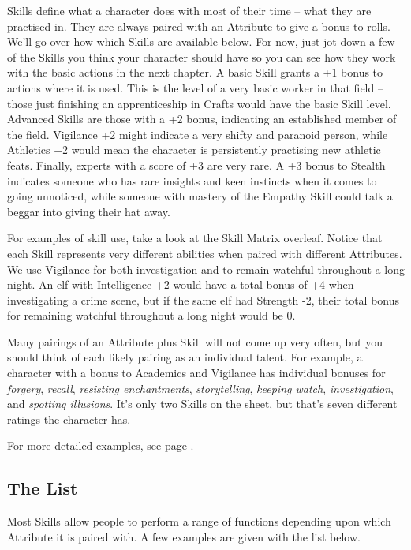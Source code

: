 \begin{multicols}{2}
\noindent
Skills define what a character does with most of their time -- what they are practised in.
They are always paired with an Attribute to give a bonus to rolls.
We'll go over how which Skills are available below.
For now, just jot down a few of the Skills you think your character should have so you can see how they work with the basic actions in the next chapter.
A basic Skill grants a +1 bonus to actions where it is used.
This is the level of a very basic worker in that field -- those just finishing an apprenticeship in Crafts would have the basic Skill level.
Advanced Skills are those with a +2 bonus, indicating an established member of the field.
Vigilance +2 might indicate a very shifty and paranoid person, while Athletics +2 would mean the character is persistently practising new athletic feats.
Finally, experts with a score of +3 are very rare.
A +3 bonus to Stealth indicates someone who has rare insights and keen instincts when it comes to going unnoticed, while someone with mastery of the Empathy Skill could talk a beggar into giving their hat away.

For examples of skill use, take a look at the Skill Matrix overleaf.  Notice that each Skill represents very different abilities when paired with different Attributes.
We use Vigilance for both investigation and to remain watchful throughout a long night.
An elf with Intelligence +2 would have a total bonus of +4 when investigating a crime scene, but if the same elf had Strength -2, their total bonus for remaining watchful throughout a long night would be 0.

Many pairings of an Attribute plus Skill will not come up very often, but you should think of each likely pairing as an individual talent.
For example, a character with a bonus to Academics and Vigilance has individual bonuses for \textit{forgery}, \textit{recall}, \textit{resisting enchantments}, \textit{storytelling}, \textit{keeping watch}, \textit{investigation}, and \textit{spotting illusions}.
It's only two Skills on the sheet, but that's seven different ratings the character has.

For more detailed examples, see page \pageref{skill_uses}.

\label{skills}
\subsection{The List}

Most Skills allow people to perform a range of functions depending upon which Attribute it is paired with. A few examples are given with the list below.


\end{multicols}
